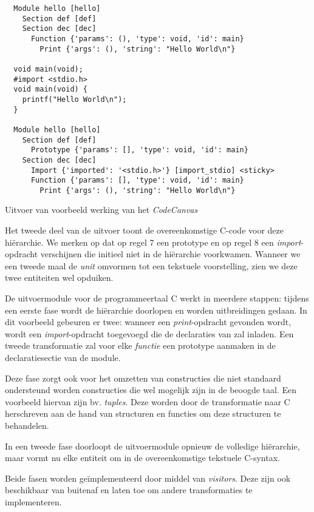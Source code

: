 \begin{listing}[ht]
  \begin{verbatim}
  Module hello [hello]
    Section def [def]
    Section dec [dec]
      Function {'params': (), 'type': void, 'id': main}
        Print {'args': (), 'string': "Hello World\n"}

  void main(void);
  #import <stdio.h>
  void main(void) {
    printf("Hello World\n");
  }
  
  Module hello [hello]
    Section def [def]
      Prototype {'params': [], 'type': void, 'id': main}
    Section dec [dec]
      Import {'imported': '<stdio.h>'} [import_stdio] <sticky>
      Function {'params': [], 'type': void, 'id': main}
        Print {'args': (), 'string': "Hello World\n"}
  \end{verbatim}
  \vspace{-5mm}
  \caption{Uitvoer van voorbeeld werking van het \emph{CodeCanvas}}
  \label{lst:codecanvas-output}
\end{listing}

Het tweede deel van de uitvoer toont de overeenkomstige C-code voor deze
hi\"erarchie. We merken op dat op regel 7 een prototype en op regel 8 een
\emph{import}-opdracht verschijnen die initieel niet in de hi\"erarchie
voorkwamen. Wanneer we een tweede maal de \emph{unit} omvormen tot een
tekstuele voorstelling, zien we deze twee entiteiten wel opduiken.

De uitvoermodule voor de programmeertaal C werkt in meerdere stappen: tijdens
een eerste fase wordt de hi\"erarchie doorlopen en worden uitbreidingen gedaan.
In dit voorbeeld gebeuren er twee: wanneer een \emph{print}-opdracht gevonden
wordt, wordt een \emph{import}-opdracht toegevoegd die de declaraties van
 zal inladen. Een tweede transformatie zal voor elke
\emph{functie} een prototype aanmaken in de declaratiesectie van de module.

Deze fase zorgt ook voor het omzetten van constructies die niet standaard
ondersteund worden constructies die wel mogelijk zijn in de beoogde taal. Een
voorbeeld hiervan zijn bv. \emph{tuples}. Deze worden door de transformatie
naar C herschreven aan de hand van structuren en functies om deze structuren te
behandelen.

In een tweede fase doorloopt de uitvoermodule opnieuw de volledige
hi\"erarchie, maar vormt nu elke entiteit om in de overeenkomstige tekstuele
C-syntax.

Beide fasen worden ge\"implementeerd door middel van \emph{visitors}. Deze zijn
ook beschikbaar van buitenaf en laten toe om andere transformaties te
implementeren.

